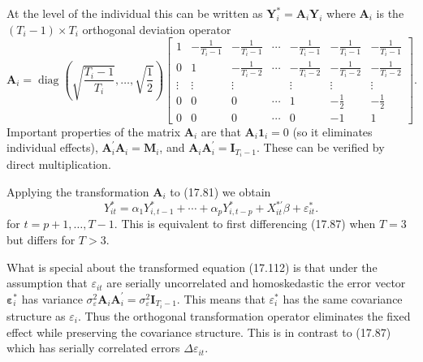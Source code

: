 \documentclass[10pt]{article}
\begin{document}
At the level of the individual this can be written as $\boldsymbol{Y}_{i}^{*}=\boldsymbol{A}_{i} \boldsymbol{Y}_{i}$ where $\boldsymbol{A}_{i}$ is the $\left(T_{i}-1\right) \times T_{i}$ orthogonal deviation operator
$$
\boldsymbol{A}_{i}=\operatorname{diag}\left(\sqrt{\frac{T_{i}-1}{T_{i}}}, \ldots, \sqrt{\frac{1}{2}}\right)\left[\begin{array}{ccccccc}
1 & -\frac{1}{T_{i}-1} & -\frac{1}{T_{i}-1} & \cdots & -\frac{1}{T_{i}-1} & -\frac{1}{T_{i}-1} & -\frac{1}{T_{i}-1} \\
0 & 1 & -\frac{1}{T_{i}-2} & \cdots & -\frac{1}{T_{i}-2} & -\frac{1}{T_{i}-2} & -\frac{1}{T_{i}-2} \\
\vdots & \vdots & \vdots & & \vdots & \vdots & \vdots \\
0 & 0 & 0 & \cdots & 1 & -\frac{1}{2} & -\frac{1}{2} \\
0 & 0 & 0 & \cdots & 0 & -1 & 1
\end{array}\right] .
$$
Important properties of the matrix $\boldsymbol{A}_{i}$ are that $\boldsymbol{A}_{i} \mathbf{1}_{i}=0$ (so it eliminates individual effects), $\boldsymbol{A}_{i}^{\prime} \boldsymbol{A}_{i}=\boldsymbol{M}_{i}$, and $\boldsymbol{A}_{i} \boldsymbol{A}_{i}^{\prime}=\boldsymbol{I}_{T_{i}-1}$. These can be verified by direct multiplication.

Applying the transformation $\boldsymbol{A}_{i}$ to (17.81) we obtain
$$
Y_{i t}^{*}=\alpha_{1} Y_{i, t-1}^{*}+\cdots+\alpha_{p} Y_{i, t-p}^{*}+X_{i t}^{* \prime} \beta+\varepsilon_{i t}^{*} .
$$
for $t=p+1, \ldots, T-1$. This is equivalent to first differencing (17.87) when $T=3$ but differs for $T>3$.

What is special about the transformed equation (17.112) is that under the assumption that $\varepsilon_{i t}$ are serially uncorrelated and homoskedastic the error vector $\boldsymbol{\varepsilon}_{i}^{*}$ has variance $\sigma_{\varepsilon}^{2} \boldsymbol{A}_{i} \boldsymbol{A}_{i}^{\prime}=\sigma_{\varepsilon}^{2} \boldsymbol{I}_{T_{i}-1}$. This means that $\varepsilon_{i}^{*}$ has the same covariance structure as $\varepsilon_{i}$. Thus the orthogonal transformation operator eliminates the fixed effect while preserving the covariance structure. This is in contrast to (17.87) which has serially correlated errors $\Delta \varepsilon_{i t}$.
\end{document}
